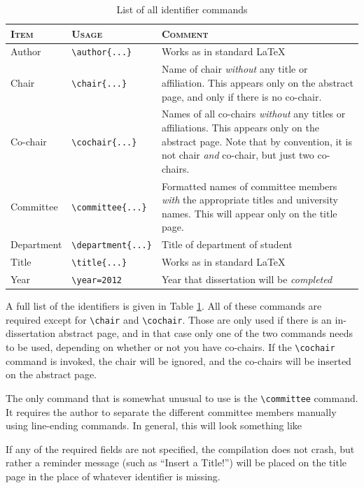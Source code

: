 \documentclass[thesis]{./tex/thesis-umich}
\begin{document}
\begin{table}
 \caption{ \label{tab:identifiers}
  List of all identifier commands}
 \centering
 \small
 \begin{tabular}{l @{\hspace{16pt}} l @{\hspace{16pt}} p{6cm}}
  \hline \hline
  \textsc{Item} & \textsc{Usage} & \textsc{Comment} \\
  \hline
  Author      & \verb|\author{...}|
   & Works as in standard \LaTeX \\
  Chair       & \verb|\chair{...}|
   & Name of chair \emph{without} any title or affiliation.  This
     appears only on the abstract page, and only if there is no
     co-chair. \\
  Co-chair    & \verb|\cochair{...}|
   & Names of all co-chairs \emph{without} any titles or
     affiliations.  This appears only on the abstract page.  Note
     that by convention, it is not chair \emph{and} co-chair, but
     just two co-chairs. \\
  Committee   & \verb|\committee{...}|
   & Formatted names of committee members \emph{with} the
     appropriate titles and university names.  This will appear
     only on the title page. \\
  Department  & \verb|\department{...}|
   & Title of department of student \\
  Title       & \verb|\title{...}|
   & Works as in standard \LaTeX \\
  Year        & \verb|\year=2012|
   & Year that dissertation will be \emph{completed} \\
  \hline \hline
 \end{tabular}
\end{table}

A full list of the identifiers is given in Table \ref{tab:identifiers}.
All of these commands are required except for \verb|\chair| and
\verb|\cochair|.  Those are only used if there is an in-dissertation
abstract page, and in that case only one of the two commands needs to
be used, depending on whether or not you have co-chairs.  If the
\verb|\cochair| command is invoked, the chair will be ignored, and the
co-chairs will be inserted on the abstract page.

The only command that is somewhat unusual to use is the
\verb|\committee| command.  It requires the author to separate the
different committee members manually using line-ending commands.  In
general, this will look something like
\begin{code}
\end{code}
If any of the required fields are not specified, the compilation does
not crash, but rather a reminder message (such as ``Insert a Title!'')
will be placed on the title page in the place of whatever identifier
is missing.
\end{document}

